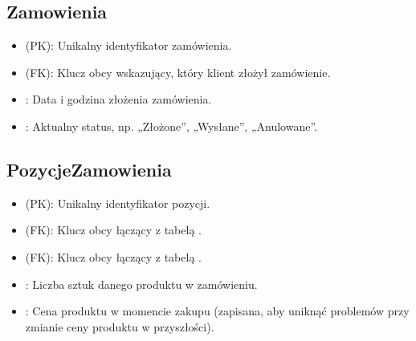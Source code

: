 \documentclass[a4paper,11pt,polish]{sphinxmanual}
\begin{document}
\subsection{Zamowienia}
\label{\detokenize{rozdzial_3:zamowienia}}\begin{description}
\begin{itemize}
\item {} 
\sphinxAtStartPar
{} (PK): Unikalny identyfikator zamówienia.

\item {} 
\sphinxAtStartPar
{} (FK): Klucz obcy wskazujący, który klient złożył zamówienie.

\item {} 
\sphinxAtStartPar
{}: Data i godzina złożenia zamówienia.

\item {} 
\sphinxAtStartPar
{}: Aktualny status, np. „Złożone”, „Wysłane”, „Anulowane”.

\end{itemize}

\end{description}


\subsection{PozycjeZamowienia}
\label{\detokenize{rozdzial_3:pozycjezamowienia}}\begin{description}
\begin{itemize}
\item {} 
\sphinxAtStartPar
{} (PK): Unikalny identyfikator pozycji.

\item {} 
\sphinxAtStartPar
{} (FK): Klucz obcy łączący z tabelą .

\item {} 
\sphinxAtStartPar
{} (FK): Klucz obcy łączący z tabelą .

\item {} 
\sphinxAtStartPar
{}: Liczba sztuk danego produktu w zamówieniu.

\item {} 
\sphinxAtStartPar
{}: Cena produktu w momencie zakupu (zapisana, aby uniknąć problemów przy zmianie ceny produktu w przyszłości).

\end{itemize}

\end{description}
\end{document}

